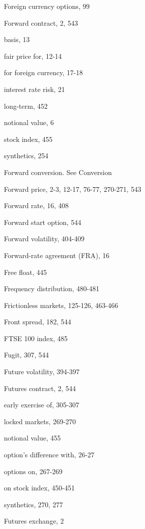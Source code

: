\noindent Foreign currency options, 99\par
\noindent Forward contract, 2, 543\par
\noindent basis, 13\par
\noindent fair price for, 12-14\par
\noindent for foreign currency, 17-18\par
\noindent interest rate risk, 21\par
\noindent long-term, 452\par
\noindent notional value, 6\par
\noindent stock index, 455\par
\noindent synthetics, 254\par
\noindent Forward conversion. See Conversion\par
\noindent Forward price, 2-3, 12-17, 76-77, 270-271, 543\par
\noindent Forward rate, 16, 408\par
\noindent Forward start option, 544\par
\noindent Forward volatility, 404-409\par
\noindent Forward-rate agreement (FRA), 16\par
\noindent Free float, 445\par
\noindent Frequency distribution, 480-481\par
\noindent Frictionless markets, 125-126, 463-466\par
\noindent Front spread, 182, 544\par
\noindent FTSE 100 index, 485\par
\noindent Fugit, 307, 544\par
\noindent Future volatility, 394-397\par
\noindent Futures contract, 2, 544\par
\noindent early exercise of, 305-307\par
\noindent locked markets, 269-270\par
\noindent notional value, 455\par
\noindent option's difference with, 26-27\par
\noindent options on, 267-269\par
\noindent on stock index, 450-451\par
\noindent synthetics, 270, 277\par
\noindent Futures exchange, 2\par


